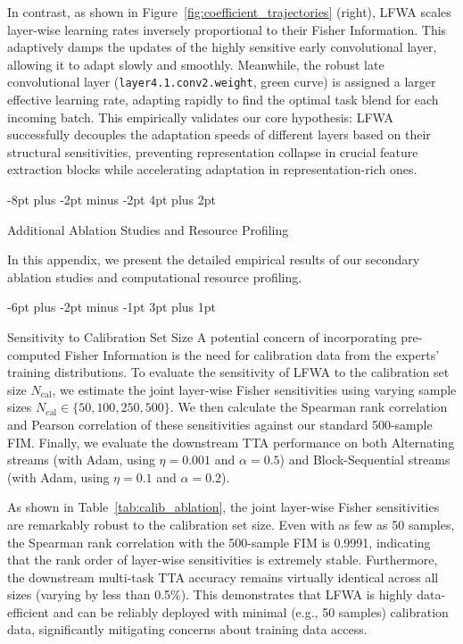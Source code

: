 \documentclass{article}
\makeatletter
\theoremstyle{plain}
\theoremstyle{definition}
\theoremstyle{remark}
\renewcommand{\section}{\@startsection{section}{1}{\z@}%
                       {-8pt plus -2pt minus -2pt}%
                       {4pt plus 2pt}%
                       {\normalfont\large\bfseries\raggedright}}
\renewcommand{\subsection}{\@startsection{subsection}{2}{\z@}%
                          {-6pt plus -2pt minus -1pt}%
                          {3pt plus 1pt}%
                          {\normalfont\normalsize\bfseries\raggedright}}
\makeatother
\begin{document}
In contrast, as shown in Figure~\ref{fig:coefficient_trajectories} (right), LFWA scales layer-wise learning rates inversely proportional to their Fisher Information. This adaptively damps the updates of the highly sensitive early convolutional layer, allowing it to adapt slowly and smoothly. Meanwhile, the robust late convolutional layer (\texttt{layer4.1.conv2.weight}, green curve) is assigned a larger effective learning rate, adapting rapidly to find the optimal task blend for each incoming batch. This empirically validates our core hypothesis: LFWA successfully decouples the adaptation speeds of different layers based on their structural sensitivities, preventing representation collapse in crucial feature extraction blocks while accelerating adaptation in representation-rich ones.



\newpage
\section{Additional Ablation Studies and Resource Profiling}
\label{sec:appendix_ablations}

In this appendix, we present the detailed empirical results of our secondary ablation studies and computational resource profiling.

\subsection{Sensitivity to Calibration Set Size}
A potential concern of incorporating pre-computed Fisher Information is the need for calibration data from the experts' training distributions. To evaluate the sensitivity of LFWA to the calibration set size $N_{\text{cal}}$, we estimate the joint layer-wise Fisher sensitivities using varying sample sizes $N_{\text{cal}} \in \{50, 100, 250, 500\}$. We then calculate the Spearman rank correlation and Pearson correlation of these sensitivities against our standard 500-sample FIM. Finally, we evaluate the downstream TTA performance on both Alternating streams (with Adam, using $\eta = 0.001$ and $\alpha = 0.5$) and Block-Sequential streams (with Adam, using $\eta = 0.1$ and $\alpha = 0.2$).

As shown in Table~\ref{tab:calib_ablation}, the joint layer-wise Fisher sensitivities are remarkably robust to the calibration set size. Even with as few as 50 samples, the Spearman rank correlation with the 500-sample FIM is 0.9991, indicating that the rank order of layer-wise sensitivities is extremely stable. Furthermore, the downstream multi-task TTA accuracy remains virtually identical across all sizes (varying by less than 0.5\%). This demonstrates that LFWA is highly data-efficient and can be reliably deployed with minimal (e.g., 50 samples) calibration data, significantly mitigating concerns about training data access.
\end{document}
